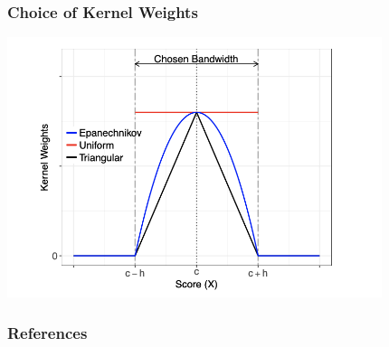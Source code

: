 \documentclass[table, xcolor = {dvipsnames}, 9pt]{beamer}
\theoremstyle{plain}
\begin{document}
\begin{frame}
\frametitle{Choice of Kernel Weights}
\begin{center}
\includegraphics[height=3in, keepaspectratio=1]{figures/kernel.png}
\end{center}
\end{frame}
\begin{frame}
\frametitle{References} 
\scriptsize

\end{frame}
\end{document}
